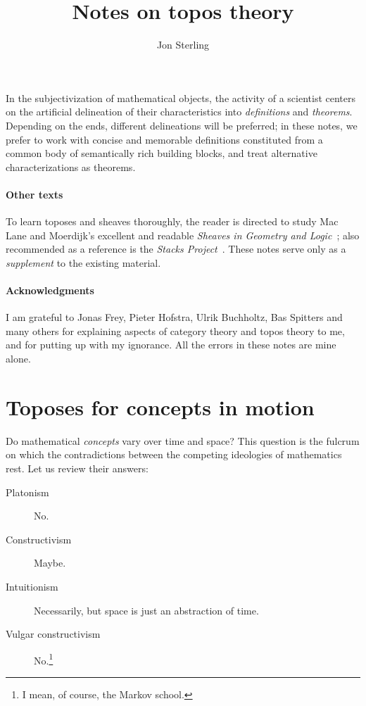 \documentclass{article}
\title{Notes on topos theory}
\author{Jon Sterling}
\affil{Carnegie Mellon University}
\date{}
\begin{document}
\maketitle

In the subjectivization of mathematical objects, the activity of a
scientist centers on the artificial delineation of their
characteristics into \emph{definitions} and \emph{theorems}. Depending
on the ends, different delineations will be preferred; in these notes,
we prefer to work with concise and memorable definitions constituted
from a common body of semantically rich building blocks, and treat
alternative characterizations as theorems.

\paragraph{Other texts}
To learn toposes and sheaves thoroughly, the reader is directed to
study Mac Lane and Moerdijk's excellent and readable \emph{Sheaves in
  Geometry and Logic}~\cite{maclane-moerdijk:1992}; also recommended
as a reference is the \emph{Stacks
  Project}~\cite{stacks-project}. These notes serve only as a
\emph{supplement} to the existing material.

\paragraph{Acknowledgments}

I am grateful to Jonas Frey, Pieter Hofstra, Ulrik Buchholtz, Bas
Spitters and many others for explaining aspects of category theory and
topos theory to me, and for putting up with my ignorance. All the
errors in these notes are mine alone.


\section{Toposes for concepts in motion}

Do mathematical \emph{concepts} vary over time and space? This
question is the fulcrum on which the contradictions between the
competing ideologies of mathematics rest. Let us review their answers:
\begin{description}
\item[Platonism] No.
\item[Constructivism] Maybe.
\item[Intuitionism] Necessarily, but space is just an abstraction of
  time.
\item[Vulgar constructivism] No.\footnote{I mean, of course, the Markov school.}
\end{description}
\end{document}
